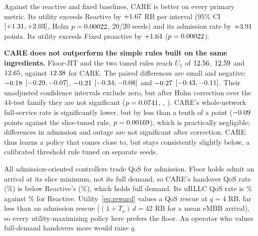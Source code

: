 \documentclass[conference]{IEEEtran}
\begin{document}
Against the reactive and fixed baselines, CARE is better on every primary metric. Its utility exceeds Reactive by $+1.67$ RB per interval (95\% CI $[+1.31,+2.03]$, Holm $p=0.00022$, 20/20 seeds) and its admission rate by $+3.91$ points. Its utility exceeds Fixed proactive by $+1.64$ ($p=0.00022$).

\textbf{CARE does not outperform the simple rules built on the same ingredients.} Floor-JIT and the two tuned rules reach $U_1$ of $12.56$, $12.59$ and $12.65$, against $12.38$ for CARE. The paired differences are small and negative: $-0.18$ $[-0.29,-0.07]$, $-0.21$ $[-0.34,-0.08]$ and $-0.27$ $[-0.43,-0.11]$. Their unadjusted confidence intervals exclude zero, but after Holm correction over the 44-test family they are not significant ($p=0.0741$, \VsTunedUtilP, \VsSliceTunedUtilP). CARE's whole-network full-service rate is significantly lower, but by less than a tenth of a point ($-0.09$ points against the slice-tuned rule, $p=0.00169$), which is practically negligible; differences in admission and outage are not significant after correction. CARE thus learns a policy that comes close to, but stays consistently slightly below, a calibrated threshold rule tuned on separate seeds.

All admission-oriented controllers trade QoS for admission. Floor holds admit an arrival at its slice minimum, not its full demand, so CARE's handover QoS rate (\CareQoS\%) is below Reactive's (\ReactiveQoS\%), which holds full demand. Its uRLLC QoS rate is \CareURLLCQoS\% against \ReactiveURLLCQoS\% for Reactive. Utility~\eqref{eq:reward} values a QoS rescue at $q=4$ RB, far less than an admission rescue ($(1+T_o)\,d=42$ RB for a mean eMBB arrival), so every utility-maximizing policy here prefers the floor. An operator who values full-demand handovers more would raise $q$.

\begin{table}[!t]
\centering
\caption{Held-out results at $\lambda=1$: means over 20 test seeds (32 UEs, 320 intervals). HSR: handover admission rate (\%); QoS: handover QoS rate (\%); Outage: share of UE-intervals in re-establishment (\%); Full: share of UE-intervals receiving full demand, whole network (\%); Served: served share of offered RBs (\%); Displ.: incumbent RB-intervals displaced by holds (\% of capacity); $U_1$: net utility per interval in slice-weighted RBs. Ablations below the line.}
\label{tab:main}

\end{table}
\end{document}
